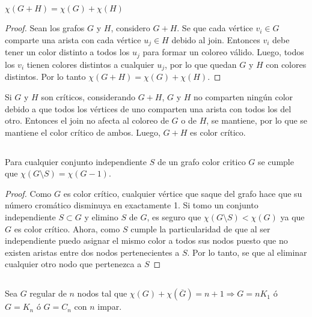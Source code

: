 \subsection{}
\begin{prop}
	$\chi(G + H) = \chi(G) + \chi(H)$
\end{prop}

\begin{proof}
	Sean los grafos $G$ y $H$, considero $G + H$. Se que cada vértice $v_i \in G$ comparte una arista con cada vértice $u_j \in H$ debido al join. Entonces $v_i$ debe tener un color distinto a todos los $u_j$ para formar un coloreo válido. Luego, todos los $v_i$ tienen colores distintos a cualquier $u_j$, por lo que quedan $G$ y $H$ con colores distintos. Por lo tanto $\chi(G + H) = \chi(G) + \chi(H)$.
\end{proof}

\begin{cor}
	Si $G$ y $H$ son críticos, considerando $G + H$, $G$ y $H$ no comparten ningún color debido a que todos los vértices de uno comparten una arista con todos los del otro. Entonces el join no afecta al coloreo de $G$ o de $H$, se mantiene, por lo que se mantiene el color crítico de ambos. Luego, $G + H$ es color crítico.
\end{cor}

\subsection{}
\begin{lema}
	Para cualquier conjunto independiente $S$ de un grafo color critico $G$ se cumple que $\chi(G \setminus S) = \chi(G - 1)$.
\end{lema}

\begin{proof}
	Como $G$ es color crítico, cualquier vértice que saque del grafo hace que su número cromático disminuya en exactamente 1. Si tomo un conjunto independiente $S \subset G$ y elimino $S$ de $G$, es seguro que $\chi(G \setminus S) < \chi(G)$ ya que $G$ es color crítico. Ahora, como $S$ cumple la particularidad de que al ser independiente puedo asignar el mismo color a todos sus nodos puesto que no existen aristas entre dos nodos pertenecientes a $S$. Por lo tanto, se que al eliminar cualquier otro nodo que pertenezca a $S$ 
\end{proof}

\setcounter{subsection}{12}
\subsection{}
\begin{lema}
	Sea $G$ regular de $n$ nodos tal que $\chi(G) + \chi(\overline{G}) = n + 1 \Longrightarrow G = n K_1$ ó $G = K_n$ ó $G = C_n$ con $n$ impar.
\end{lema}

